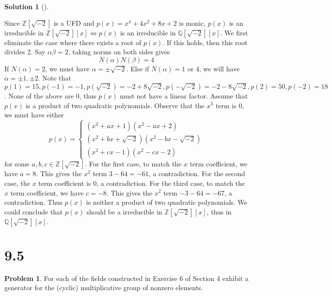 \documentclass{article}
\theoremstyle{definition}
\newtheorem{prob}{Problem}
\newtheorem*{sol}{Solution}
\newenvironment{sols}[1][]{%
  \begin{sol}[#1]$ $\par\nobreak\ignorespaces
}{%
  \end{sol}
}
\begin{document}
\begin{sols}
	Since $\mathbb{Z}[\sqrt{-2}]$ is a UFD and $p(x) = x^4 + 4x^2 + 8x + 2$ is monic, $p(x)$ is an irreducible in $\mathbb{Z}[\sqrt{-2}][x] \Leftrightarrow p(x)$ is an irreducible in $\mathbb{Q}[\sqrt{-2}][x]$.
	We first eliminate the case where there exists a root of $p(x)$. 
	If this holds, then this root divides 2.
	Say $\alpha \beta = 2$, taking norms on both sides gives
	\[
		N(\alpha) N(\beta) = 4
	\]
	If $N(\alpha) = 2$, we must have $\alpha = \pm \sqrt{-2}$. 
	Else if $N(\alpha) = 1$ or 4, we will have $\alpha = \pm 1, \pm 2$. 
	Note that $p(1) = 15, p(-1) = -1, p(\sqrt{-2}) = -2 + 8 \sqrt{-2}, p(-\sqrt{-2}) = -2 - 8 \sqrt{-2}, p(2) = 50, p(-2) = 18$. 
	None of the above are 0, thus $p(x)$ must not have a linear factor. 
	Assume that $p(x)$ is a product of two quadratic polynomials. 
	Observe that the $x^3$ term is 0, we must have either 
	\[
		p(x) = 
		\begin{cases}
			(x^2 + ax + 1)( x^2 - ax + 2)\\
			(x^2 + bx + \sqrt{-2})(x^2 - bx - \sqrt{-2})\\
			(x^2 + cx - 1)(x^2 - cx - 2)
		\end{cases}
	\]
	for some $a, b, c \in \mathbb{Z}[\sqrt{-2}]$. 
	For the first case, to match the $x$ term coefficient, we have $a = 8$. 
	This gives the $x^2$ term $3 - 64 = -61$, a contradiction.
	For the second case, the $x$ term coefficient is 0, a contradiction.
	For the third case, to match the $x$ term coefficient, we have $c = -8$. 
	This gives the $x^2$ term $-3 - 64 = -67$, a contradiction.
	Thus $p(x)$ is neither a product of two quadratic polynomials. 
	We could conclude that $p(x)$ should be a irreducible in $\mathbb{Z}[\sqrt{-2}][x]$, thus in $\mathbb{Q}[\sqrt{-2}][x]$. 
	

\end{sols}

\section*{9.5}

\setcounter{prob}{1}
\begin{prob}
	For each of the fields constructed in Exercise 6 of Section 4 exhibit a generator for the (cyclic) multiplicative group of nonzero elements. 
\end{prob}
\end{document}
